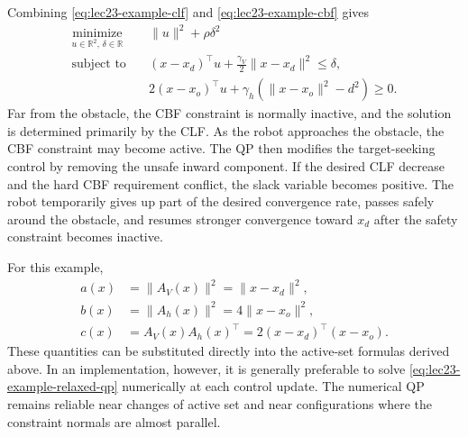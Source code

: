 \documentclass[../../master-handout.tex]{subfiles}
\begin{document}
Combining \eqref{eq:lec23-example-clf} and \eqref{eq:lec23-example-cbf} gives
\begin{equation}
\begin{aligned}
    \underset{u\in\mathbb{R}^{2},\,\delta\in\mathbb{R}}{\operatorname{minimize}}
    \quad&
    \|u\|^2+\rho\delta^2
    \\
    \text{subject to}
    \quad&
    (x-x_d)^\top u
    +
    \frac{\gamma_V}{2}\|x-x_d\|^2
    \leq
    \delta,
    \\
    &
    2(x-x_o)^\top u
    +
    \gamma_h
    \left(
        \|x-x_o\|^2-d^2
    \right)
    \geq
    0.
\end{aligned}
\label{eq:lec23-example-relaxed-qp}
\end{equation}
Far from the obstacle, the CBF constraint is normally inactive, and the solution is determined primarily by the CLF. As the robot approaches the obstacle, the CBF constraint may become active. The QP then modifies the target-seeking control by removing the unsafe inward component. If the desired CLF decrease and the hard CBF requirement conflict, the slack variable becomes positive. The robot temporarily gives up part of the desired convergence rate, passes safely around the obstacle, and resumes stronger convergence toward $x_d$ after the safety constraint becomes inactive.

For this example,
\begin{align}
    a(x)
    &=
    \|A_V(x)\|^2
    =
    \|x-x_d\|^2,
    \\
    b(x)
    &=
    \|A_h(x)\|^2
    =
    4\|x-x_o\|^2,
    \\
    c(x)
    &=
    A_V(x)A_h(x)^\top
    =
    2(x-x_d)^\top(x-x_o).
\end{align}
These quantities can be substituted directly into the active-set formulas derived above. In an implementation, however, it is generally preferable to solve \eqref{eq:lec23-example-relaxed-qp} numerically at each control update. The numerical QP remains reliable near changes of active set and near configurations where the constraint normals are almost parallel.
\end{document}
